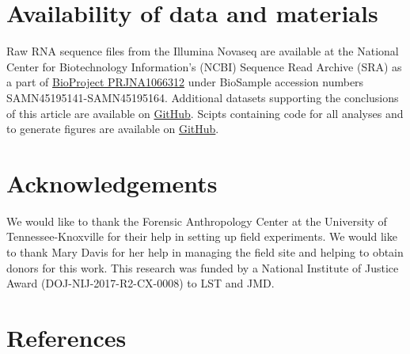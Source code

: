 \documentclass[
  sn-nature,
  lineno, referee]{sn-jnl}
\begin{document}
\section{Availability of data and
materials}\label{availability-of-data-and-materials}

Raw RNA sequence files from the Illumina Novaseq are available at the
National Center for Biotechnology Information's (NCBI) Sequence Read
Archive (SRA) as a part of
\href{https://www.ncbi.nlm.nih.gov/bioproject/PRJNA1066312/}{BioProject
PRJNA1066312} under BioSample accession numbers
SAMN45195141-SAMN45195164. Additional datasets supporting the
conclusions of this article are available on
\href{https://github.com/amason30/Mason_MetaT_XXX_2024}{GitHub}. Scipts
containing code for all analyses and to generate figures are available
on \href{https://github.com/amason30/Mason_MetaT_XXX_2024}{GitHub}.

\section{Acknowledgements}\label{acknowledgements}

We would like to thank the Forensic Anthropology Center at the
University of Tennessee-Knoxville for their help in setting up field
experiments. We would like to thank Mary Davis for her help in managing
the field site and helping to obtain donors for this work. This research
was funded by a National Institute of Justice Award
(DOJ-NIJ-2017-R2-CX-0008) to LST and JMD.

\section{References}\label{references}
\end{document}
